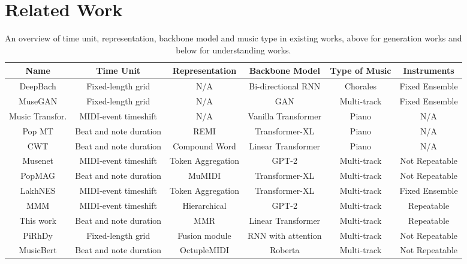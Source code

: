\documentclass{article}
\begin{document}
\section{Related Work}
\begin{table*}[htbp]
\renewcommand{\arraystretch}{1.2}
\small
  \centering
    \begin{tabular}{c|ccccc}
    \textbf{Name} & \textbf{Time Unit} & \textbf{Representation} & \textbf{Backbone Model} & \textbf{Type of Music} & \textbf{Instruments}\\
    \toprule
    DeepBach \cite{deepbach} & Fixed-length grid & N/A   & Bi-directional  RNN & Chorales & Fixed Ensemble\\
    MuseGAN \cite{musegan} & Fixed-length grid & N/A   & GAN   & Multi-track & Fixed Ensemble\\
    Music Transfor. \cite{mt}    & MIDI-event timeshift & N/A & Vanilla Transformer & Piano & N/A\\
    Pop MT \cite{popmt} & Beat and note duration & REMI  & Transformer-XL & Piano  & N/A\\
    CWT \cite{cwt}   &  Beat and note duration & Compound Word & Linear Transformer & Piano  & N/A\\
    Musenet \cite{musenet} & MIDI-event timeshift & Token Aggregation & GPT-2 & Multi-track & Not Repeatable\\
    PopMAG \cite{popmag} &  Beat and note duration  & MuMIDI & Transformer-XL & Multi-track  & Not Repeatable\\
    LakhNES \cite{lakhnes} & MIDI-event timeshift & Token Aggregation & Transformer-XL & Multi-track & Fixed Ensemble\\
    MMM \cite{mmm}   & MIDI-event timeshift & Hierarchical & GPT-2 & Multi-track &  Repeatable\\
    This work &  Beat and note duration  & MMR   & Linear Transformer & Multi-track & Repeatable\\
    \midrule
    PiRhDy \cite{pirhdy} & Fixed-length grid & Fusion module & RNN with attention &  Multi-track  & Not Repeatable\\
    MusicBert \cite{musicbert} &  Beat and note duration  & OctupleMIDI & Roberta & Multi-track & Not Repeatable\\
    \bottomrule
    \end{tabular}\caption{An overview of time unit, representation, backbone model and music type in existing works, above for generation works and below for understanding works. }
  \label{tab:previous-work}\end{table*}
\end{document}
